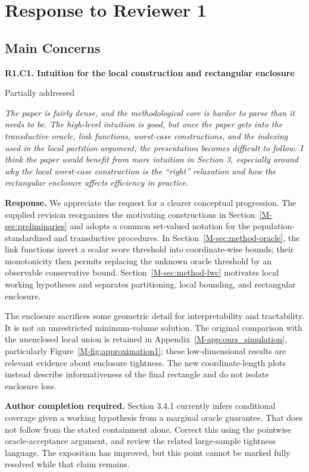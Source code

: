 \documentclass[11pt]{article}
\newcommand{\mssec}[1]{Section~\ref*{M-#1}}
\newcommand{\msapp}[1]{Appendix~\ref*{M-#1}}
\newcommand{\msfig}[1]{Figure~\ref*{M-#1}}
\newcommand{\action}[1]{\par{\small\color{ActionRed}\textbf{Author completion required.} #1\par}}
\newcommand{\point}[3]{\par\Needspace{7\baselineskip}\medskip
\noindent\parbox[t]{0.77\linewidth}{\textbf{#1}}\hfill
\parbox[t]{0.21\linewidth}{\raggedleft\small\sffamily #2}\par\nopagebreak
{\color{ReviewerBlue}\small\itshape #3\par}\textbf{Response.} }
\begin{document}
\clearpage
\section*{Response to Reviewer 1}
\subsection*{Main Concerns}

\point{R1.C1. Intuition for the local construction and rectangular enclosure}{Partially addressed}{The paper is fairly dense, and the methodological core is harder to parse
than it needs to be. The high-level intuition is good, but once the paper
gets into the transductive oracle, link functions, worst-case
constructions, and the indexing used in the local partition argument,
the presentation becomes difficult to follow. I think the paper would
benefit from more intuition in Section 3, especially around why the local
worst-case construction is the ``right'' relaxation and how the
rectangular enclosure affects efficiency in practice.}
\label{response:R1.C1}
We appreciate the request for a clearer conceptual progression. The supplied revision reorganizes the motivating constructions in \mssec{sec:preliminaries} and adopts a common set-valued notation for the population-standardized and transductive procedures. In \mssec{sec:method-oracle}, the link functions invert a scalar score threshold into coordinate-wise bounds; their monotonicity then permits replacing the unknown oracle threshold by an observable conservative bound. \mssec{sec:method-lwc} motivates local working hypotheses and separates partitioning, local bounding, and rectangular enclosure.

The enclosure sacrifices some geometric detail for interpretability and tractability. It is not an unrestricted minimum-volume solution. The original comparison with the unenclosed local union is retained in \msapp{app:ours_simulation}, particularly \msfig{fig:approximation1}; these low-dimensional results are relevant evidence about enclosure tightness. The new coordinate-length plots instead describe informativeness of the final rectangle and do not isolate enclosure loss.

\action{Section 3.4.1 currently infers conditional coverage given a working hypothesis from a marginal oracle guarantee. That does not follow from the stated containment alone. Correct this using the pointwise oracle-acceptance argument, and review the related large-sample tightness language. The exposition has improved, but this point cannot be marked fully resolved while that claim remains.}
\end{document}
